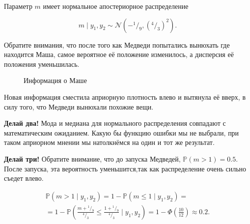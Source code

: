 \documentclass[12pt, a4paper, oneside]{extreport}
\def \mN{\mathcal{N}}
\def \mbb{\mathbb}
\def \PP{\mbb{P}}
\newcommand{\fr}[2]{\ensuremath{^#1/_#2}}   %
\newcommand\gauss[2]{1/(#2*sqrt(2*pi))*exp(-((x-#1)^2)/(2*#2^2))}
\theoremstyle{plain}              %
\theoremstyle{definition}         %
\begin{document}
Параметр $m$ имеет нормальное апостериорное распределение

\[m \mid y_1, y_2 \sim \mN(-\fr{1}{9},(\fr{4}{3})^2).\] 

 Обратите внимания, что после того как Медведи попытались вынюхать где находится Маша, самое вероятное её положение изменилось, а дисперсия её положения уменьшилась.

\begin{figure}[h!]
\begin{center}
\end{center}
\caption{Информация  о Маше}
\end{figure}

Новая информация сместила априорную плотность влево и вытянула её вверх, в силу того, что Медведи вынюхали похожие вещи.

\textbf{Делай два!} Мода и медиана для нормального распределения совпадают с математическим ожиданием. Какую бы функцию ошибки мы не выбрали, при таком априорном мнении мы натолкнёмся на один и тот же результат.

\textbf{Делай три!} Обратите внимание, что до запуска Медведей, $\PP(m > 1) = 0.5$. После запуска, эта вероятность уменьшится,так как распределение очень сильно съедет влево.

\begin{multline*}
\PP(m > 1 \mid y_1,y_2) = 1 - \PP( m \le 1 \mid y_1,y_2) = \\ = 1 - \PP\left( \frac{m + \fr{1}{9}}{\fr{4}{3}} \le \frac{1 + \fr{1}{9}}{\fr{4}{3}} \mid  y_1, y_2 \right) = 1 - \Phi\left(\frac{10}{12}\right) \approx 0.2.
\end{multline*}
\end{document}
